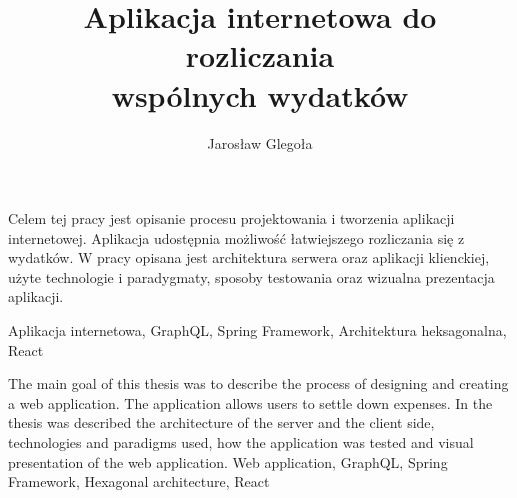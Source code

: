 \documentclass[
    left=2.5cm,         %
    right=2.5cm,        %
    top=2.5cm,          %
    bottom=3cm,         %
    bindingoffset=6mm,  %
    nohyphenation=false %
]{eiti/eiti-thesis}
\begin{document}
\EngineerThesis %
{}
\title{
    Aplikacja internetowa do rozliczania\\ wspólnych wydatków
}
\author{Jarosław Glegoła}
\date{\the\year}
\maketitle

\cleardoublepage %
\streszczenie Celem tej pracy jest opisanie procesu projektowania i tworzenia aplikacji internetowej. Aplikacja udostępnia możliwość łatwiejszego rozliczania się z wydatków. W pracy opisana jest architektura serwera oraz aplikacji klienckiej, użyte technologie i paradygmaty, sposoby testowania oraz wizualna prezentacja aplikacji.

\slowakluczowe Aplikacja internetowa, GraphQL, Spring Framework, Architektura heksagonalna, React

\newpage
\abstract The main goal of this thesis was to describe the process of designing and creating a web application. The application allows users to settle down expenses. In the thesis was described the architecture of the server and the client side, technologies and paradigms used, how the application was tested and visual presentation of the web application.
\keywords Web application, GraphQL, Spring Framework, Hexagonal architecture, React

\cleardoublepage  %
\pagestyle{plain}
\makeauthorship

\cleardoublepage %
\tableofcontents

\cleardoublepage %
\pagestyle{headings}
\end{document}

